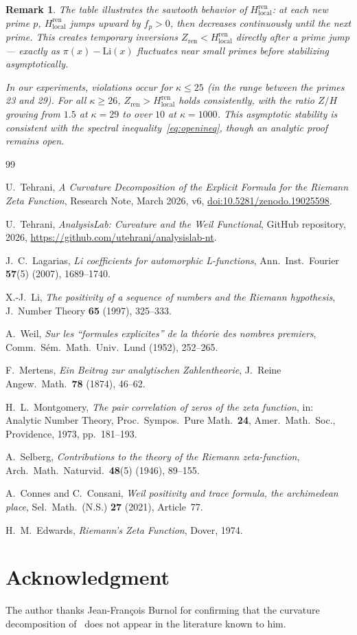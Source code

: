 \documentclass[11pt]{article}
\newtheorem*{remark*}{Remark}
\begin{document}
\begin{remark*}
The table illustrates the sawtooth behavior of
$H_{\mathrm{local}}^{\mathrm{ren}}$: at each new prime $p$,
$H_{\mathrm{local}}^{\mathrm{ren}}$ jumps upward by $f_p > 0$,
then decreases continuously until the next prime.
This creates temporary inversions $Z_{\mathrm{ren}} < H_{\mathrm{local}}^{\mathrm{ren}}$
directly after a prime jump — exactly as $\pi(x) - \mathrm{Li}(x)$
fluctuates near small primes before stabilizing asymptotically.

In our experiments, violations occur for $\kappa \le 25$
(in the range between the primes 23 and 29).
For all $\kappa \ge 26$, $Z_{\mathrm{ren}} > H_{\mathrm{local}}^{\mathrm{ren}}$
holds consistently, with the ratio $Z/H$ growing from $1.5$ at $\kappa=29$
to over $10$ at $\kappa=1000$.
This asymptotic stability is consistent with the spectral
inequality~\eqref{eq:openineq}, though an analytic proof remains open.
\end{remark*}

\begin{thebibliography}{99}

U.~Tehrani,
\emph{A Curvature Decomposition of the Explicit Formula
for the Riemann Zeta Function},
Research Note, March 2026, v6,
\href{https://doi.org/10.5281/zenodo.19025598}{%
doi:10.5281/zenodo.19025598}.

U.~Tehrani,
\emph{AnalysisLab: Curvature and the Weil Functional},
GitHub repository, 2026,
\url{https://github.com/utehrani/analysislab-nt}.

J.~C.~Lagarias,
\emph{Li coefficients for automorphic L-functions},
Ann.\ Inst.\ Fourier \textbf{57}(5) (2007), 1689--1740.

X.-J.~Li,
\emph{The positivity of a sequence of numbers
and the Riemann hypothesis},
J.\ Number Theory \textbf{65} (1997), 325--333.

A.~Weil,
\emph{Sur les ``formules explicites'' de la
th\'eorie des nombres premiers},
Comm.\ S\'em.\ Math.\ Univ.\ Lund (1952), 252--265.

F.~Mertens,
\emph{Ein Beitrag zur analytischen Zahlentheorie},
J.\ Reine Angew.\ Math.\ \textbf{78} (1874), 46--62.

H.~L.~Montgomery,
\emph{The pair correlation of zeros of the zeta function},
in: Analytic Number Theory, Proc.\ Sympos.\ Pure Math.\ \textbf{24},
Amer.\ Math.\ Soc., Providence, 1973, pp.\ 181--193.

A.~Selberg,
\emph{Contributions to the theory of the Riemann zeta-function},
Arch.\ Math.\ Naturvid.\ \textbf{48}(5) (1946), 89--155.

A.~Connes and C.~Consani,
\emph{Weil positivity and trace formula, the archimedean place},
Sel.\ Math.\ (N.S.) \textbf{27} (2021), Article~77.

H.~M.~Edwards,
\emph{Riemann's Zeta Function},
Dover, 1974.

\end{thebibliography}

\section*{Acknowledgment}

The author thanks Jean-Fran\c{c}ois Burnol for confirming that the
curvature decomposition of~\cite{paper1} does not appear in the
literature known to him.
\end{document}
